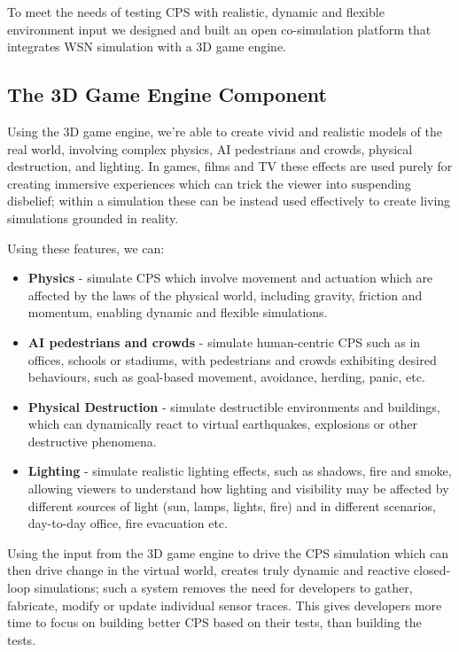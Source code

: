 To meet the needs of testing CPS with realistic, dynamic and flexible environment input we designed and built an open co-simulation platform that integrates WSN simulation with a 3D game engine. 

\subsection{The 3D Game Engine Component} %
\label{sub:a_3d_game_engine}

Using the 3D game engine, we're able to create vivid and realistic models of the real world, involving complex physics, AI pedestrians and crowds, physical destruction, and lighting. In games, films and TV these effects are used purely for creating immersive experiences which can trick the viewer into suspending disbelief; within a simulation these can be instead used effectively to create living simulations grounded in reality. 

Using these features, we can:
\begin{itemize}
   \item \textbf{Physics} - simulate CPS which involve movement and actuation which are affected by the laws of the physical world, including gravity, friction and momentum, enabling dynamic and flexible simulations.
   \item \textbf{AI pedestrians and crowds} - simulate human-centric CPS such as in offices, schools or stadiums, with pedestrians and crowds exhibiting desired behaviours, such as goal-based movement, avoidance, herding, panic, etc.
   \item \textbf{Physical Destruction} - simulate destructible environments and buildings, which can dynamically react to virtual earthquakes, explosions or other destructive phenomena.
   \item \textbf{Lighting} - simulate realistic lighting effects, such as shadows, fire and smoke, allowing viewers to understand how lighting and visibility may be affected by different sources of light (sun, lamps, lights, fire) and in different scenarios, day-to-day office, fire evacuation etc. 
 \end{itemize} 


 Using the input from the 3D game engine to drive the CPS simulation which can then drive change in the virtual world, creates truly dynamic and reactive closed-loop simulations; such a system removes the need for developers to gather, fabricate, modify or update individual sensor traces. This gives developers more time to focus on building better CPS based on their tests, than building the tests.

